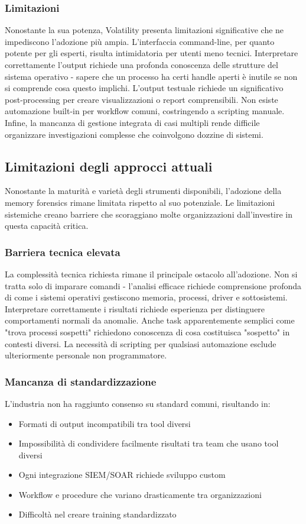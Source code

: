 \subsubsection{Limitazioni}
Nonostante la sua potenza, Volatility presenta limitazioni significative che ne impediscono l'adozione più ampia. L'interfaccia command-line, per quanto potente per gli esperti, risulta intimidatoria per utenti meno tecnici. Interpretare correttamente l'output richiede una profonda conoscenza delle strutture del sistema operativo - sapere che un processo ha certi handle aperti è inutile se non si comprende cosa questo implichi. L'output testuale richiede un significativo post-processing per creare visualizzazioni o report comprensibili. Non esiste automazione built-in per workflow comuni, costringendo a scripting manuale. Infine, la mancanza di gestione integrata di casi multipli rende difficile organizzare investigazioni complesse che coinvolgono dozzine di sistemi.

\subsection{Limitazioni degli approcci attuali}

Nonostante la maturità e varietà degli strumenti disponibili, l'adozione della memory forensics rimane limitata rispetto al suo potenziale. Le limitazioni sistemiche creano barriere che scoraggiano molte organizzazioni dall'investire in questa capacità critica.

\subsubsection{Barriera tecnica elevata}
La complessità tecnica richiesta rimane il principale ostacolo all'adozione. Non si tratta solo di imparare comandi - l'analisi efficace richiede comprensione profonda di come i sistemi operativi gestiscono memoria, processi, driver e sottosistemi. Interpretare correttamente i risultati richiede esperienza per distinguere comportamenti normali da anomalie. Anche task apparentemente semplici come "trova processi sospetti" richiedono conoscenza di cosa costituisca "sospetto" in contesti diversi. La necessità di scripting per qualsiasi automazione esclude ulteriormente personale non programmatore.

\subsubsection{Mancanza di standardizzazione}
L'industria non ha raggiunto consenso su standard comuni, risultando in:
\begin{itemize}
    \item Formati di output incompatibili tra tool diversi
    \item Impossibilità di condividere facilmente risultati tra team che usano tool diversi  
    \item Ogni integrazione SIEM/SOAR richiede sviluppo custom
    \item Workflow e procedure che variano drasticamente tra organizzazioni
    \item Difficoltà nel creare training standardizzato
\end{itemize}

